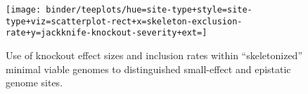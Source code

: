 \begin{figure}
  \centering
  \texttt{[image: binder/teeplots/hue=site-type+style=site-type+viz=scatterplot-rect+x=skeleton-exclusion-rate+y=jackknife-knockout-severity+ext=]}
  \vspace{-0.25in}
  \caption{%
    Use of knockout effect sizes and inclusion rates within ``skeletonized'' minimal viable genomes to distinguished small-effect and epistatic genome sites.
  }
  \label{fig:epistatic}
  \vspace{-0.25in}
\end{figure}
